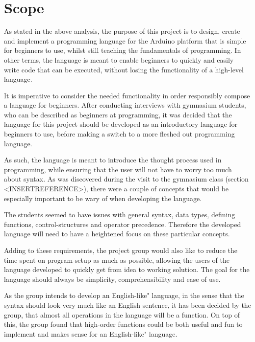 \section{Scope}
As stated in the above analysis, the purpose of this project is to design, create and implement a programming language for the Arduino platform that is simple for beginners to use, whilst still teaching the fundamentals of programming.
In other terms, the language is meant to enable beginners to quickly and easily write
code that can be executed, without losing the functionality of a high-level language.

It is imperative to consider the needed functionality in order responsibly compose a language for beginners.
After conducting interviews with gymnasium students, who can be described as beginners at programming, it was decided that the language for this project should be developed as an introductory language for beginners to use, before making a switch to a more fleshed out programming language.

As such, the language is meant to introduce the thought process used in programming, while ensuring that the user will not have to worry too much about syntax.
As was discovered during the visit to the gymnasium class (section <INSERTREFERENCE>), there were a couple of concepts that would be especially important to be wary of when developing the language.

The students seemed to have issues with general syntax, data types, defining functions, control-structures and operator precedence.
Therefore the developed language will need to have a heightened focus on these particular concepts. 

Adding to these requirements, the project group would also like to reduce the time spent on program-setup as much as possible, allowing the users of the language developed to quickly get from idea to working solution.
The goal for the language should always be simplicity, comprehensibility and ease of use.

As the group intends to develop an English-like" language, in the sense that the syntax should look very much like an English sentence, it has been decided by the group, that almost all operations in the language will be a function. 
On top of this, the group found that high-order functions could be both useful and fun to implement and makes sense for an English-like" language. 

